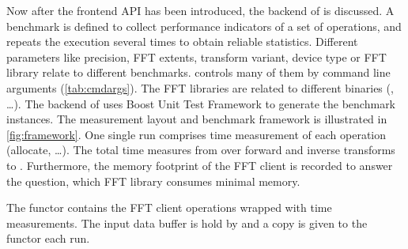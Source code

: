 Now after the frontend API has been introduced, the backend of \gearshifft{} is discussed.
A benchmark is defined to collect performance indicators of a set of operations, and repeats the execution several times to obtain reliable statistics. Different parameters like precision, FFT extents, transform variant, device type or FFT library relate to different benchmarks.
\gearshifft{} controls many of them by command line arguments (\cref{tab:cmdargs}). The FFT libraries are related to different \gearshifft{} binaries (, \ldots).
The backend of \gearshifft{} uses Boost Unit Test Framework to generate the benchmark instances. %
%
The measurement layout and benchmark framework is illustrated in \cref{fig:framework}.
One single run comprises time measurement of each operation (allocate, \ldots). 
The total time measures from  over forward and inverse transforms to .
Furthermore, the memory footprint of the FFT client is recorded to answer the question, which FFT library consumes minimal memory.

The functor  contains the FFT client operations wrapped with time measurements. The input data buffer is hold by  and a copy is given to the  functor each run.

